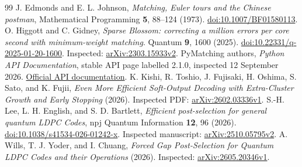 \documentclass[11pt]{article}
\theoremstyle{definition}
\theoremstyle{plain}
\theoremstyle{remark}
\begin{document}
\begin{thebibliography}{99}
J. Edmonds and E. L. Johnson,
\emph{Matching, Euler tours and the Chinese postman},
Mathematical Programming \textbf{5}, 88--124 (1973).
\href{https://doi.org/10.1007/BF01580113}{doi:10.1007/BF01580113}.
O. Higgott and C. Gidney,
\emph{Sparse Blossom: correcting a million errors per core second
with minimum-weight matching}.
Quantum \textbf{9}, 1600 (2025).
\href{https://doi.org/10.22331/q-2025-01-20-1600}{doi:10.22331/q-2025-01-20-1600}.
Inspected: \href{https://arxiv.org/abs/2303.15933v2}{arXiv:2303.15933v2}.
PyMatching authors, \emph{Python API Documentation}, stable API
page labelled 2.1.0, inspected 12 September 2026.
\href{https://pymatching.readthedocs.io/en/stable/api.html}{Official API documentation}.
K. Kishi, R. Toshio, J. Fujisaki, H. Oshima, S. Sato, and K. Fujii,
\emph{Even More Efficient Soft-Output Decoding with Extra-Cluster
Growth and Early Stopping} (2026).
Inspected PDF: \href{https://arxiv.org/abs/2602.03336v1}{arXiv:2602.03336v1}.
S.-H. Lee, L. H. English, and S. D. Bartlett,
\emph{Efficient post-selection for general quantum LDPC Codes},
npj Quantum Information \textbf{12}, 96 (2026).
\href{https://doi.org/10.1038/s41534-026-01242-x}{doi:10.1038/s41534-026-01242-x}.
Inspected manuscript: \href{https://arxiv.org/abs/2510.05795v2}{arXiv:2510.05795v2}.
A. Wills, T. J. Yoder, and I. Chuang,
\emph{Forced Gap Post-Selection for Quantum LDPC Codes and their Operations}
(2026). Inspected: \href{https://arxiv.org/abs/2605.20346v1}{arXiv:2605.20346v1}.


\end{thebibliography}
\end{document}
